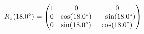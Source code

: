 \documentclass[preview]{standalone}
\begin{document}
\begin{align*}
\special{dvisvgm:raw <g id='unique000'>}R_x(18.0^\circ) = \begin{pmatrix} 1 & 0 & 0 \\ 0 & \cos(18.0^\circ) & -\sin(18.0^\circ) \\ 0 & \sin(18.0^\circ) & \cos(18.0^\circ) \end{pmatrix}\special{dvisvgm:raw </g>}
\end{align*}
\end{document}
